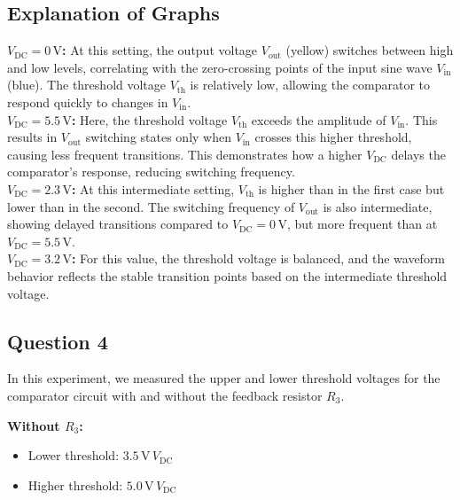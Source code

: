 \documentclass{article}
\begin{document}
\subsection*{Explanation of Graphs}

\textbf{\( V_{\text{DC}} = 0\,\text{V} \):} 
At this setting, the output voltage \( V_{\text{out}} \) (yellow) switches between high and 
low levels, correlating with the zero-crossing points of the input sine 
wave \( V_{\text{in}} \) (blue). The threshold voltage \( V_{\text{th}} \) is 
relatively low, allowing the comparator to respond quickly to changes in \( V_{\text{in}} \).
\\

\textbf{\( V_{\text{DC}} = 5.5\,\text{V} \):}
Here, the threshold voltage \( V_{\text{th}} \) exceeds the amplitude of \( V_{\text{in}} \). 
This results in \( V_{\text{out}} \) switching states only when \( V_{\text{in}} \) 
crosses this higher threshold, causing less frequent transitions. This demonstrates how a 
higher \( V_{\text{DC}} \) delays the comparator's response, reducing switching frequency.
\\

\textbf{\( V_{\text{DC}} = 2.3\,\text{V} \):}
At this intermediate setting, \( V_{\text{th}} \) is higher than in the first case but 
lower than in the second. The switching frequency of \( V_{\text{out}} \) is also 
intermediate, showing delayed transitions compared to \( V_{\text{DC}} = 0\,\text{V} \), 
but more frequent than at \( V_{\text{DC}} = 5.5\,\text{V} \).
\\

\textbf{\( V_{\text{DC}} = 3.2\,\text{V} \):}
For this value, the threshold voltage is balanced, and the waveform behavior reflects the 
stable transition points based on the intermediate threshold voltage.
\\

\subsection*{Question 4}
In this experiment, we measured the upper and lower threshold voltages for 
the comparator circuit with and without the feedback resistor \( R_3 \).

\textbf{Without \( R_3 \):}
\begin{itemize}
    \item Lower threshold: \( 3.5\,\text{V} \, V_{\text{DC}} \)
    \item Higher threshold: \( 5.0\,\text{V} \, V_{\text{DC}} \)
\end{itemize}
\end{document}
